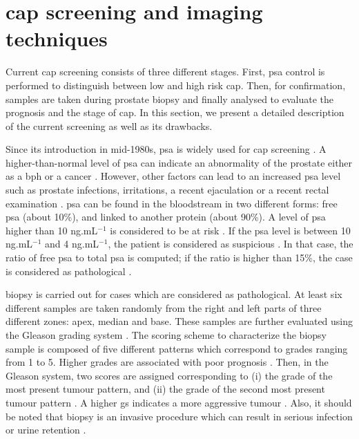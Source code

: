 \section{\ac{cap} screening and imaging techniques}\label{sec:intro:screening}

Current \ac{cap} screening consists of three different stages.
First, \ac{psa} control is performed to distinguish between low and high risk \ac{cap}.
Then, for confirmation, samples are taken during prostate biopsy and finally analysed to evaluate the prognosis and the stage of \ac{cap}.
In this section, we present a detailed description of the current screening as well as its drawbacks.

Since its introduction in mid-1980s, \ac{psa} is widely used for \ac{cap} screening \cite{Etzioni2002}.
A higher-than-normal level of \ac{psa} can indicate an abnormality of the prostate either as a \ac{bph} or a cancer \cite{Hoeks2011}.
However, other factors can lead to an increased \ac{psa} level such as prostate infections, irritations, a recent ejaculation or a recent rectal examination \cite{Parfait2010}.
\ac{psa} can be found in the bloodstream in two different forms: free \ac{psa} (about 10\%), and linked to another protein (about 90\%).
A level of \ac{psa} higher than 10 ng.mL$^{-1}$ is considered to be at risk \cite{Parfait2010}.
If the \ac{psa} level is between 10 ng.mL$^{-1}$ and 4 ng.mL$^{-1}$, the patient is considered as suspicious \cite{Barentsz2012}.
In that case, the ratio of free \ac{psa} to total \ac{psa} is computed; if the ratio is higher than 15\%, the case is considered as pathological \cite{Parfait2010}.

 biopsy is carried out for cases which are considered as pathological.
At least six different samples are taken randomly from the right and left parts of three different zones: apex, median and base.
These samples are further evaluated using the Gleason grading system \cite{Gleason1977}.
The scoring scheme to characterize the biopsy sample is composed of five different patterns which correspond to grades ranging from 1 to 5.
Higher grades are associated with poor prognosis \cite{Epstein2005}.
Then, in the Gleason system, two scores are assigned corresponding to (i) the grade of the most present tumour pattern, and (ii) the grade of the second most present tumour pattern \cite{Epstein2005}.
A higher \ac{gs} indicates a more aggressive tumour \cite{Epstein2005}.
Also, it should be noted that biopsy is an invasive procedure which can result in serious infection or urine retention \cite{Hara2005,Chou2011}.

